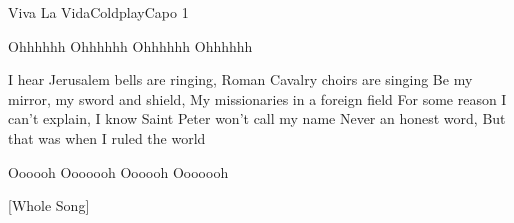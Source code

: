 \begin{song}{Viva La Vida}{Coldplay}{Capo 1}

Ohhhhhh       Ohhhhhh   Ohhhhhh       Ohhhhhh

I hear Jerusalem bells are ringing, Roman Cavalry choirs are singing
Be my mirror, my sword and shield, My missionaries in a foreign field
For some reason I can't explain, I know Saint Peter won't call my name
Never an honest word, But that was when I ruled the world

Oooooh      Ooooooh  
Oooooh      Ooooooh  
















[Whole Song]
\end{song}
